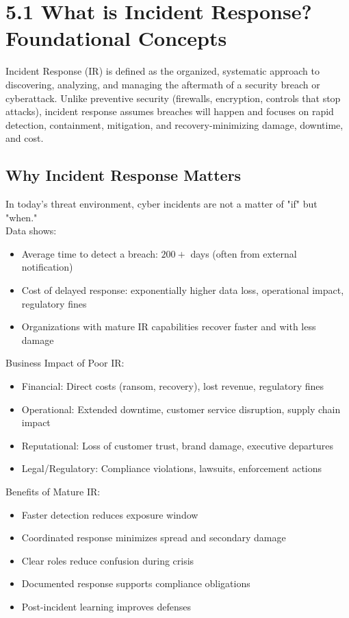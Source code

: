 \documentclass[10pt]{article}
\begin{document}
\section*{5.1 What is Incident Response? Foundational Concepts}
Incident Response (IR) is defined as the organized, systematic approach to discovering, analyzing, and managing the aftermath of a security breach or cyberattack. Unlike preventive security (firewalls, encryption, controls that stop attacks), incident response assumes breaches will happen and focuses on rapid detection, containment, mitigation, and recovery-minimizing damage, downtime, and cost.

\subsection*{Why Incident Response Matters}
In today's threat environment, cyber incidents are not a matter of "if" but "when."\\
Data shows:

\begin{itemize}
  \item Average time to detect a breach: $200+$ days (often from external notification)
  \item Cost of delayed response: exponentially higher data loss, operational impact, regulatory fines
  \item Organizations with mature IR capabilities recover faster and with less damage
\end{itemize}
Business Impact of Poor IR:
\begin{itemize}
  \item Financial: Direct costs (ransom, recovery), lost revenue, regulatory fines
  \item Operational: Extended downtime, customer service disruption, supply chain impact
  \item Reputational: Loss of customer trust, brand damage, executive departures
  \item Legal/Regulatory: Compliance violations, lawsuits, enforcement actions 
\end{itemize}
Benefits of Mature IR:
\begin{itemize}
  \item Faster detection reduces exposure window
  \item Coordinated response minimizes spread and secondary damage
  \item Clear roles reduce confusion during crisis
  \item Documented response supports compliance obligations
  \item Post-incident learning improves defenses
\end{itemize}
\end{document}
